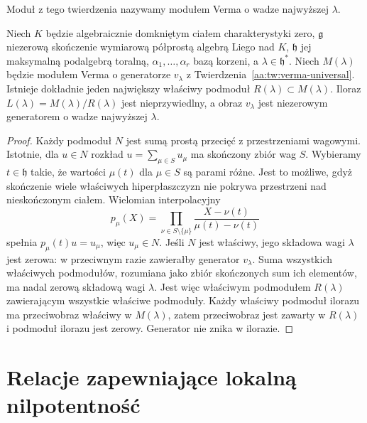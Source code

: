 Moduł z tego twierdzenia nazywamy modułem Verma o wadze najwyższej $\lambda$.

\begin{lemat}
\label{aa:lem:verma-simple-quotient}
Niech $K$ będzie algebraicznie domkniętym ciałem charakterystyki zero, $\mathfrak g$ niezerową skończenie wymiarową półprostą algebrą Liego nad $K$, $\mathfrak h$ jej maksymalną podalgebrą toralną, $\alpha_1,\ldots,\alpha_r$ bazą korzeni, a $\lambda\in\mathfrak h^*$. Niech $M(\lambda)$ będzie modułem Verma o generatorze $v_\lambda$ z Twierdzenia~\ref{aa:tw:verma-universal}. Istnieje dokładnie jeden największy właściwy podmoduł $R(\lambda)\subset M(\lambda)$. Iloraz $L(\lambda)=M(\lambda)/R(\lambda)$ jest nieprzywiedlny, a obraz $v_\lambda$ jest niezerowym generatorem o wadze najwyższej $\lambda$.
\end{lemat}
\begin{proof}
Każdy podmoduł $N$ jest sumą prostą przecięć z przestrzeniami wagowymi. Istotnie, dla $u\in N$ rozkład $u=\sum_{\mu\in S}u_\mu$ ma skończony zbiór wag $S$. Wybieramy $t\in\mathfrak h$ takie, że wartości $\mu(t)$ dla $\mu\in S$ są parami różne. Jest to możliwe, gdyż skończenie wiele właściwych hiperpłaszczyzn nie pokrywa przestrzeni nad nieskończonym ciałem. Wielomian interpolacyjny
\[
 p_\mu(X)=\prod_{\nu\in S\setminus\{\mu\}}
 \frac{X-\nu(t)}{\mu(t)-\nu(t)}
\]
spełnia $p_\mu(t)u=u_\mu$, więc $u_\mu\in N$. Jeśli $N$ jest właściwy, jego składowa wagi $\lambda$ jest zerowa: w przeciwnym razie zawierałby generator $v_\lambda$. Suma wszystkich właściwych podmodułów, rozumiana jako zbiór skończonych sum ich elementów, ma nadal zerową składową wagi $\lambda$. Jest więc właściwym podmodułem $R(\lambda)$ zawierającym wszystkie właściwe podmoduły. Każdy właściwy podmoduł ilorazu ma przeciwobraz właściwy w $M(\lambda)$, zatem przeciwobraz jest zawarty w $R(\lambda)$ i podmoduł ilorazu jest zerowy. Generator nie znika w ilorazie.
\end{proof}

\section{Relacje zapewniające lokalną nilpotentność}

